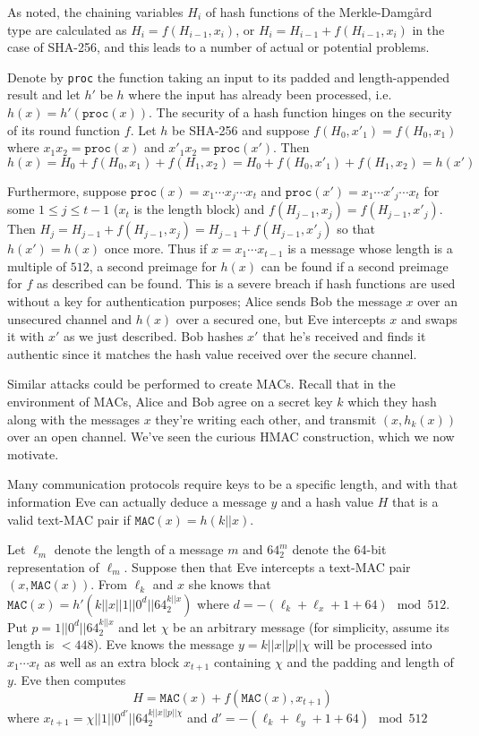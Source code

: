\documentclass[a4paper,12pt]{article}
\begin{document}
As noted, the chaining variables $H_i$ of hash functions of the Merkle-Damg\aa rd type are calculated as $H_i = f(H_{i-1},x_i)$, or $H_i = H_{i-1}+f(H_{i-1},x_i)$ in the case of SHA-256, and this leads to a number of actual or potential problems.

Denote by \texttt{proc} the function taking an input to its padded and length-appended result and let $h'$ be $h$ where the input has already been processed, i.e. $h(x) = h'(\texttt{proc}(x))$. The security of a hash function hinges on the security of its round function $f$. Let $h$ be SHA-256 and suppose $f(H_0,x'_1) = f(H_0,x_1)$ where $x_1 x_2 = \texttt{proc}(x)$ and $x'_1 x_2 = \texttt{proc}(x')$. Then
$$h(x) = H_0 + f(H_0,x_1) + f(H_1,x_2) = H_0+f(H_0,x'_1)+f(H_1,x_2) = h(x')$$

Furthermore, suppose $\texttt{proc}(x) = x_1 \cdots x_j \cdots x_t$ and $\texttt{proc}(x') = x_1 \cdots x'_j \cdots x_t$ for some $1 \leq j \leq t-1$ ($x_t$ is the length block) and $f(H_{j-1},x_j) =f(H_{j-1},x'_j)$. Then $H_j = H_{j-1}+f(H_{j-1},x_j) = H_{j-1}+f(H_{j-1},x'_j)$ so that $h(x') = h(x)$ once more. Thus if $x = x_1 \cdots x_{t-1}$ is a message whose length is a multiple of $512$, a second preimage for $h(x)$ can be found if a second preimage for $f$ as described can be found. This is a severe breach if hash functions are used without a key for authentication purposes; Alice sends Bob the message $x$ over an unsecured channel and $h(x)$ over a secured one, but Eve intercepts $x$ and swaps it with $x'$ as we just described. Bob hashes $x'$ that he's received and finds it authentic since it matches the hash value received over the secure channel.

Similar attacks could be performed to create MACs. Recall that in the environment of MACs, Alice and Bob agree on a secret key $k$ which they hash along with the messages $x$ they're writing each other, and transmit $(x,h_k(x))$ over an open channel. We've seen the curious HMAC construction, which we now motivate. \cite[p. 355]{menezes}

Many communication protocols require keys to be a specific length, and with that information Eve can actually deduce a message $y$ and a hash value $H$ that is a valid text-MAC pair if $\texttt{MAC}(x) = h(k||x)$.

Let $\ell_m$ denote the length of a message $m$ and $64_2^{m}$ denote the 64-bit representation of $\ell_m$. Suppose then that Eve intercepts a text-MAC pair $(x,\texttt{MAC}(x))$. From $\ell_k$ and $x$ she knows that $\texttt{MAC}(x) = h'(k||x||1||0^d||64_2^{k||x})$ where $d = -(\ell_k+\ell_x+1+64) \mod 512$. Put $p = 1||0^d||64_2^{k||x}$ and let $\chi$ be an arbitrary message (for simplicity, assume its length is $<448$). Eve knows the message $y = k||x||p||\chi$ will be processed into $x_1 \cdots x_t$ as well as an extra block $x_{t+1}$ containing $\chi$ and the padding and length of $y$. Eve then computes
$$H = \texttt{MAC}(x)+f(\texttt{MAC}(x),x_{t+1})$$
where $x_{t+1}=\chi||1||0^{d'}||64_2^{k||x||p||\chi}$ and $d' = -(\ell_k+\ell_y+1+64) \mod 512$
\end{document}
